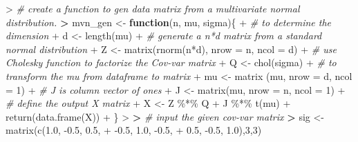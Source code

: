 \documentclass[
]{article}
\newenvironment{Shaded}{\begin{snugshade}}{\end{snugshade}}
\newcommand{\AttributeTok}[1]{\textcolor[rgb]{0.77,0.63,0.00}{#1}}
\newcommand{\CommentTok}[1]{\textcolor[rgb]{0.56,0.35,0.01}{\textit{#1}}}
\newcommand{\ControlFlowTok}[1]{\textcolor[rgb]{0.13,0.29,0.53}{\textbf{#1}}}
\newcommand{\DecValTok}[1]{\textcolor[rgb]{0.00,0.00,0.81}{#1}}
\newcommand{\ErrorTok}[1]{\textcolor[rgb]{0.64,0.00,0.00}{\textbf{#1}}}
\newcommand{\FloatTok}[1]{\textcolor[rgb]{0.00,0.00,0.81}{#1}}
\newcommand{\FunctionTok}[1]{\textcolor[rgb]{0.00,0.00,0.00}{#1}}
\newcommand{\NormalTok}[1]{#1}
\newcommand{\OtherTok}[1]{\textcolor[rgb]{0.56,0.35,0.01}{#1}}
\newcommand{\SpecialCharTok}[1]{\textcolor[rgb]{0.00,0.00,0.00}{#1}}
\begin{document}
\begin{Shaded}
\begin{Highlighting}[]
\SpecialCharTok{\textgreater{}} \CommentTok{\# create a function to gen data matrix from a multivariate normal distribution.}
\ErrorTok{\textgreater{}}\NormalTok{ mvn\_gen }\OtherTok{\textless{}{-}} \ControlFlowTok{function}\NormalTok{(n, mu, sigma)\{}
\SpecialCharTok{+}   \CommentTok{\# to determine the dimension}
\SpecialCharTok{+}\NormalTok{   d }\OtherTok{\textless{}{-}} \FunctionTok{length}\NormalTok{(mu)}
\SpecialCharTok{+}   \CommentTok{\# generate a n*d matrix from a standard normal distribution}
\SpecialCharTok{+}\NormalTok{   Z }\OtherTok{\textless{}{-}} \FunctionTok{matrix}\NormalTok{(}\FunctionTok{rnorm}\NormalTok{(n}\SpecialCharTok{*}\NormalTok{d), }\AttributeTok{nrow =}\NormalTok{ n, }\AttributeTok{ncol =}\NormalTok{ d)}
\SpecialCharTok{+}   \CommentTok{\# use Cholesky function to factorize the Cov{-}var matrix}
\SpecialCharTok{+}\NormalTok{   Q }\OtherTok{\textless{}{-}} \FunctionTok{chol}\NormalTok{(sigma)}
\SpecialCharTok{+}   \CommentTok{\# to transform the mu from dataframe to matrix}
\SpecialCharTok{+}\NormalTok{   mu }\OtherTok{\textless{}{-}} \FunctionTok{matrix}\NormalTok{ (mu, }\AttributeTok{nrow =}\NormalTok{ d, }\AttributeTok{ncol =} \DecValTok{1}\NormalTok{)}
\SpecialCharTok{+}   \CommentTok{\# J is column vector of ones}
\SpecialCharTok{+}\NormalTok{   J }\OtherTok{\textless{}{-}} \FunctionTok{matrix}\NormalTok{(mu, }\AttributeTok{nrow =}\NormalTok{ n, }\AttributeTok{ncol =} \DecValTok{1}\NormalTok{)}
\SpecialCharTok{+}   \CommentTok{\# define the output X matrix}
\SpecialCharTok{+}\NormalTok{   X }\OtherTok{\textless{}{-}}\NormalTok{ Z }\SpecialCharTok{\%*\%}\NormalTok{ Q }\SpecialCharTok{+}\NormalTok{ J }\SpecialCharTok{\%*\%} \FunctionTok{t}\NormalTok{(mu)}
\SpecialCharTok{+}   \FunctionTok{return}\NormalTok{(}\FunctionTok{data.frame}\NormalTok{(X))}
\SpecialCharTok{+}\NormalTok{ \}}
\SpecialCharTok{\textgreater{}} 
\ErrorTok{\textgreater{}} \CommentTok{\# input the given cov{-}var matrix}
\ErrorTok{\textgreater{}}\NormalTok{ sig }\OtherTok{\textless{}{-}} \FunctionTok{matrix}\NormalTok{(}\FunctionTok{c}\NormalTok{(}\FloatTok{1.0}\NormalTok{, }\SpecialCharTok{{-}}\FloatTok{0.5}\NormalTok{, }\FloatTok{0.5}\NormalTok{,}
\SpecialCharTok{+}                 \SpecialCharTok{{-}}\FloatTok{0.5}\NormalTok{, }\FloatTok{1.0}\NormalTok{, }\SpecialCharTok{{-}}\FloatTok{0.5}\NormalTok{,}
\SpecialCharTok{+}                 \FloatTok{0.5}\NormalTok{, }\SpecialCharTok{{-}}\FloatTok{0.5}\NormalTok{, }\FloatTok{1.0}\NormalTok{),}\DecValTok{3}\NormalTok{,}\DecValTok{3}\NormalTok{)}

\end{Highlighting}
\end{Shaded}
\end{document}
